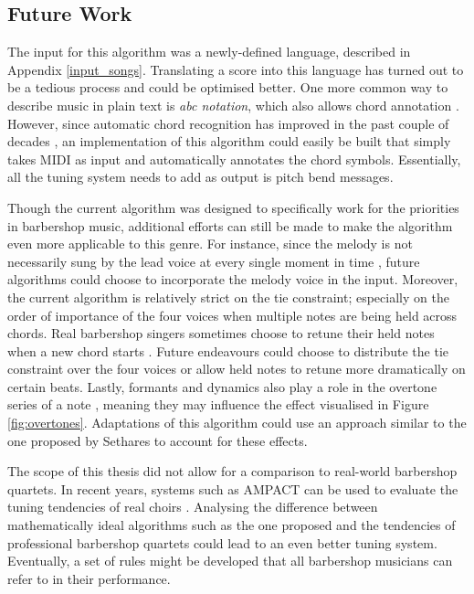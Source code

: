 \documentclass[a4paper]{article}
\begin{document}
\subsection{Future Work}
\label{future}
The input for this algorithm was a newly-defined language, described in Appendix \ref{input_songs}. Translating a score into this language has turned out to be a tedious process and could be optimised better. One more common way to describe music in plain text is \textit{abc notation}, which also allows chord annotation \cite{walshaw_abc2mtex_1997}. However, since automatic chord recognition has improved in the past couple of decades \cite{burgoyne_cross-validated_2007}, an implementation of this algorithm could easily be built that simply takes MIDI as input and automatically annotates the chord symbols. Essentially, all the tuning system needs to add as output is pitch bend messages.

Though the current algorithm was designed to specifically work for the priorities in barbershop music, additional efforts can still be made to make the algorithm even more applicable to this genre. For instance, since the melody is not necessarily sung by the lead voice at every single moment in time \cite{barbershop_harmony_society_contest_2022}, future algorithms could choose to incorporate the melody voice in the input. Moreover, the current algorithm is relatively strict on the tie constraint; especially on the order of importance of the four voices when multiple notes are being held across chords. Real barbershop singers sometimes choose to retune their held notes when a new chord starts \cite{barbershop_harmony_society_forefront_2017}. Future endeavours could choose to distribute the tie constraint over the four voices or allow held notes to retune more dramatically on certain beats. Lastly, formants and dynamics also play a role in the overtone series of a note \cite{tongeren_overtone_2023}, meaning they may influence the effect visualised in Figure \ref{fig:overtones}. Adaptations of this algorithm could use an approach similar to the one proposed by Sethares \cite{sethares_adaptive_1994} to account for these effects.

The scope of this thesis did not allow for a comparison to real-world barbershop quartets. In recent years, systems such as AMPACT can be used to evaluate the tuning tendencies of real choirs \cite{devaney_study_2012, chandna_deep-learning_2022}. Analysing the difference between mathematically ideal algorithms such as the one proposed and the tendencies of professional barbershop quartets could lead to an even better tuning system. Eventually, a set of rules might be developed that all barbershop musicians can refer to in their performance.
\end{document}
